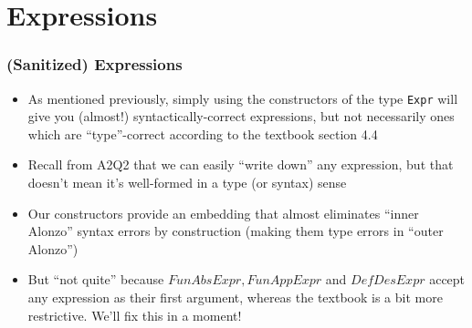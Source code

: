 \documentclass[xcolor={dvipsnames}]{beamer}
\begin{document}
\begin{frame}
\begin{thyext}
\end{thyext}
\end{frame}

\section{Expressions}
\begin{frame}
\frametitle{(Sanitized) Expressions}
\begin{itemize}
\item As mentioned previously, simply using the constructors of the type \texttt{Expr} will give you 
(almost!) syntactically-correct expressions, but not necessarily ones which are ``type''-correct according
to the textbook section 4.4
\item Recall from A2Q2 that we can easily ``write down'' any expression, but that doesn't mean it's well-formed
in a type (or syntax) sense
\item Our constructors provide an embedding that almost eliminates ``inner Alonzo'' syntax errors by 
construction (making them type errors in ``outer Alonzo'')
\item But ``not quite'' because $FunAbsExpr, FunAppExpr$ and $DefDesExpr$ accept
any expression as their first argument, whereas the textbook is a bit more restrictive. We'll fix this in a
moment!
\end{itemize}
\end{frame}
\end{document}

